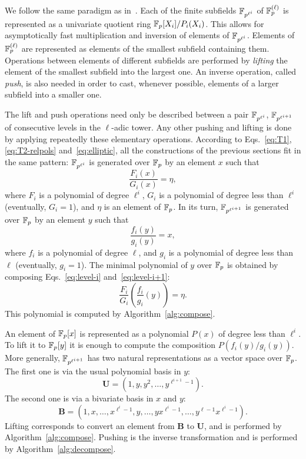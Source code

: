 \documentclass{sig-alternate}
\begin{document}
We follow the same paradigm as in~\cite{df+schost12}. Each of the
finite subfields $\mathbb{F}_{p^{\ell^i}}$ of $\mathbb{F}_p^{(\ell)}$ is represented
as a univariate quotient ring $\mathbb{F}_p[X_i]/P_i(X_i)$. This allows for
asymptotically fast multiplication and inversion of elements of
$\mathbb{F}_{p^{\ell^i}}$. Elements of $\mathbb{F}_p^{(\ell)}$ are represented as
elements of the smallest subfield containing them. Operations between
elements of different subfields are performed by \emph{lifting} the
element of the smallest subfield into the largest one. An inverse
operation, called \emph{push}, is also needed in order to cast,
whenever possible, elements of a larger subfield into a smaller one.

The lift and push operations need only be described between a pair
$\mathbb{F}_{p^{\ell^i}}$, $\mathbb{F}_{p^{\ell^{i+1}}}$ of consecutive levels in the
$\ell$-adic tower. Any other pushing and lifting is done by applying
repeatedly these elementary operations. According to
Eqs.~\eqref{eq:T1}, \eqref{eq:T2-relpols} and~\eqref{eq:elliptic}, all
the constructions of the previous sections fit in the same pattern:
$\mathbb{F}_{p^{\ell^i}}$ is generated over $\mathbb{F}_p$ by an element $x$ such that
\begin{equation}
  \label{eq:level-i}
  \frac{F_i(x)}{G_i(x)} = \eta,
\end{equation}
where $F_i$ is a polynomial of degree $\ell^i$, $G_i$ is a polynomial
of degree less than $\ell^i$ (eventually, $G_i=1$), and $\eta$ is an
element of $\mathbb{F}_p$. In its turn, $\mathbb{F}_{p^{\ell^{i+1}}}$ is generated
over $\mathbb{F}_p$ by an element $y$ such that
\begin{equation}
  \label{eq:level-i+1}
  \frac{f_i(y)}{g_i(y)} = x,
\end{equation}
where $f_i$ is a polynomial of degree $\ell$, and $g_i$ is a
polynomial of degree less than $\ell$ (eventually, $g_i=1$). The
minimal polynomial of $y$ over $\mathbb{F}_p$ is obtained by composing
Eqs.~\eqref{eq:level-i} and~\eqref{eq:level-i+1}:
\begin{equation}
  \frac{F_i}{G_i}\left(\frac{f_i}{g_i}(y)\right) = \eta.
\end{equation}
This polynomial is computed by Algorithm~\ref{alg:compose}.

An element of $\mathbb{F}_p[x]$ is represented as a polynomial $P(x)$ of
degree less than $\ell^i$. To lift it to $\mathbb{F}_p[y]$ it is enough to
compute the composition $P(f_i(y)/g_i(y))$. More generally,
$\mathbb{F}_{p^{\ell^{i+1}}}$ has two natural representations as a vector
space over $\mathbb{F}_p$. The first one is via the usual polynomial basis in
$y$:
\begin{equation}
  \label{eq:uni-basis}
  \mathbf{U} = (1,y,y^2,\ldots,y^{\ell^{i+1}-1}).
\end{equation}
The second one is via a bivariate basis in $x$ and $y$:
\begin{equation}
  \label{eq:bi-basis}
  \mathbf{B} = (1,x,\ldots,x^{\ell^i-1},y,\ldots,yx^{\ell^i-1},\ldots,y^{\ell-1}x^{\ell^i-1}).
\end{equation}
Lifting corresponds to convert an element from $\mathbf{B}$ to
$\mathbf{U}$, and is performed by Algorithm~\ref{alg:compose}. Pushing
is the inverse transformation and is performed by
Algorithm~\ref{alg:decompose}.
\end{document}
